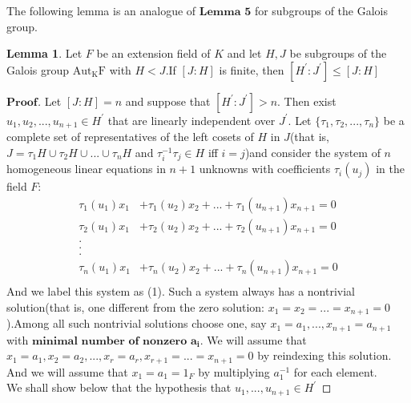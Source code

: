\documentclass[a4paper, 11pt]{article}
\theoremstyle{remark}
\newenvironment{myprf}
{\renewcommand\qedsymbol{$ $}\begin{proof}[$\mathbf{Proof}$]}
  {\end{proof}}
\theoremstyle{definition}
\newtheorem{lemma}[theorem]{Lemma}
\begin{document}
    \vspace{0.5cm}
    The following lemma is an analogue of $\textbf{Lemma 5}$ for subgroups of the Galois 
    group.
    \vspace{0.5cm}
    \begin{lemma}
            Let $F$ be an extension field of $K$ and let $H,J$ be subgroups of the Galois
            group $\mathrm{Aut_KF}$ with $H<J$.If $[J:H]$ is finite, then 
            $[H^{'}:J^{'}]\leq [J:H]$

    \end{lemma}
    \vspace{0.1cm}
    \begin{myprf}
            Let $[J:H]=n$ and suppose that $[H^{'}:J^{'}]>n$. 
            Then exist $u_1,u_2,...,u_{n+1}\in H^{'}$ that are linearly independent over
            $J^{'}$. Let $\{\tau_1,\tau_2,...,\tau_n\}$ be a complete set of 
            representatives of the left cosets of $H$ in $J$(that is, $J=\tau_1 H\cup
            \tau_2 H\cup ...\cup \tau_n H$ and $\tau_i^{-1}\tau_j\in H$ iff $i=j$)and 
            consider the system of $n$ homogeneous linear equations in $n+1$ unknowns
            with coefficients $\tau_i(u_j)$ in the field $F$:
            $$
            \begin{aligned}
                    \tau_1(u_1)x_1&+\tau_1(u_2)x_2+...+\tau_1(u_{n+1})x_{n+1}=0\\
                    \tau_2(u_1)x_1&+\tau_2(u_2)x_2+...+\tau_2(u_{n+1})x_{n+1}=0\\
                    .\\
                    .\\
                    .\\
                    \tau_n(u_1)x_1&+\tau_n(u_2)x_2+...+\tau_n(u_{n+1})x_{n+1}=0\\
            \end{aligned}
            $$ And we label this system as (1). Such a system always has a nontrivial 
            solution(that is, one different from the zero solution: $x_1=x_2=...=x_{n+1}
            =0$).Among all such nontrivial solutions choose one, say $x_1=a_1,...,x_{n+1}
            =a_{n+1}$ with $\textbf{minimal number of nonzero}$ $\mathbf{a_i}$. We will
            assume that $x_1=a_1,x_2=a_2,...,x_r=a_r,x_{r+1}=...=x_{n+1}=0$ by reindexing
            this solution. And we will assume that $x_1=a_1=1_{F}$ by multiplying 
            $a_1^{-1}$ for each element.\\
            \indent We shall show below that the hypothesis that $u_1,...,u_{n+1}\in H^{'}$

\end{myprf}
\end{document}
